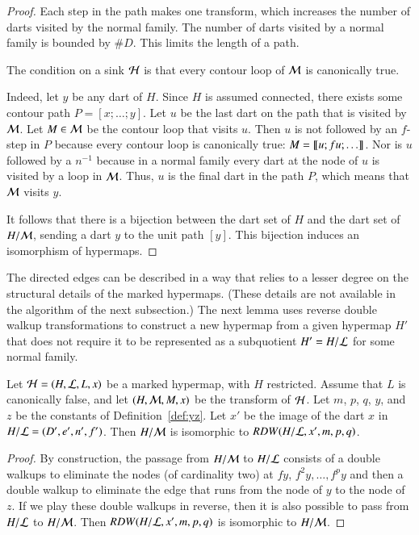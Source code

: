 \begin{proof} Each step in the path makes one transform, which
  increases the number of darts visited by the normal family.  The
  number of darts visited by a normal family is bounded by $\#D$.
  This limits the length of a path.

  The condition on a sink ${\cal H}$ is that every contour loop of
  ${\cal M}$ is canonically true. 

  Indeed, let $y$ be any dart of
$H$. Since $H$ is assumed connected, there exists some contour path
$P=[x;\ldots;y]$.  Let $u$ be the last dart on the path that is
visited by ${\cal M}$.  Let $M\in{\cal M}$ be the contour loop that
visits $u$.  Then $u$ is not followed by an $f$-step in $P$ because every contour
loop is canonically true: $M = {\llbracket{u;f u;\ldots}\rrbracket}$.
Nor is $u$ followed by a $n^{-1}$ because in a normal family every dart
at the node of $u$ is visited by a loop in ${\cal M}$.  Thus, $u$ is the final
dart in the path $P$, which means that ${\cal M}$ visits $y$.

It follows that there is a bijection between the dart set of $H$ and the
dart set of $H/{\cal M}$, sending a dart $y$ to the unit path $[y]$.
This bijection induces an isomorphism of hypermaps.
\end{proof}


The directed edges can be described in a way that relies to a
lesser degree on the structural details of the marked hypermaps.
(These details are not  available in the algorithm of the
next subsection.)  The next lemma uses reverse double walkup
transformations to construct a new hypermap from a given hypermap $H'$
that does not require it to be represented as a subquotient $H' =
H/{\cal L}$ for some normal family.

\begin{lemma}\label{lemma:RDW}
Let ${\cal H} =(H,{\cal L},L,x)$ be a marked hypermap,
  with $H$ restricted.  Assume that $L$ is canonically false, and let 
$(H,{\cal{M}},M,x)$ be 
  the transform of $\cal H$.   
Let $m$, $p$, $q$, $y$, and $z$ be
  the constants of Definition~\ref{def:yz}.  Let $x'$ be the
  image of the dart $x$ in $H/{\cal L} = (D',e',n',f')$.
Then $H/{\cal M}$ is isomorphic to $RDW(H/{\cal{L}},x',m,p,q)$.
\end{lemma}


\begin{proof}
%
  By construction, the passage from $H/{\cal M}$ to $H/{\cal L}$
  consists of a double walkups to eliminate the nodes (of cardinality two) at
  $f y$, $f^2 y, \ldots, f^p y$ and then a double walkup to eliminate
  the edge that runs from the  node of $y$ to the node of
  $z$.  
If we play these double walkups in reverse,
then it is also possible to pass from $H/{\cal L}$ to $H/{\cal M}$.  
Then $RDW(H/{\cal L},x',m,p,q)$ is isomorphic to
$H/{\cal M}$.  
\end{proof}


